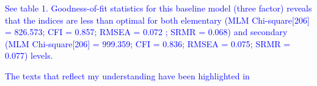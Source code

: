 \documentclass[
]{article}
\begin{document}
\textcolor{blue}{See table 1. Goodness-of-fit statistics for this baseline model (three factor) reveals that the indices are less than optimal for both elementary (MLM Chi-square[206] = 826.573; CFI = 0.857; RMSEA = 0.072 ; SRMR = 0.068) and secondary (MLM Chi-square[206] = 999.359; CFI = 0.836; RMSEA = 0.075; SRMR = 0.077) levels.}

\textcolor{blue}{The texts that reflect my understanding have been highlighted in}
\end{document}
